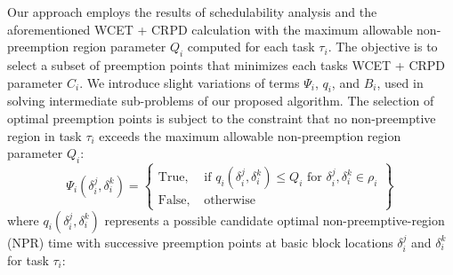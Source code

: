Our approach employs the results of schedulability analysis and the aforementioned WCET + CRPD calculation with the maximum allowable non-preemption region parameter \begin{math}Q_{i}\end{math} computed for each task \begin{math}\tau_{i}\end{math}.  The objective is to select a subset of preemption points that minimizes each tasks WCET + CRPD parameter \begin{math}C_{i}\end{math}. We introduce slight variations of terms \begin{math}\Psi_{i}\end{math}, \begin{math}q_{i}\end{math}, and \begin{math}B_{i}\end{math}, used in solving intermediate sub-problems of our proposed algorithm.  The selection of optimal preemption points is subject to the constraint that no non-preemptive region in task \begin{math}\tau_{i}\end{math} exceeds the maximum allowable non-preemption region parameter \begin{math}Q_{i}\end{math}:
\begin{equation}\label{eqn:pp-constraint}
   \Psi_{i}(\delta_{i}^{j},\delta_{i}^{k}) =
\left\{
\begin{array}{lr}
    \textrm{True, }&\textrm{if } q_{i}(\delta_{i}^{j},\delta_{i}^{k}) \leq Q_{i} \textrm{ for } \delta_{i}^{j},\delta_{i}^{k} \in \rho_{i} \\
    \textrm{False, }&\textrm{otherwise}
\end{array}
\right\}~
\end{equation}
\noindent
where \begin{math}q_{i}(\delta_{i}^{j},\delta_{i}^{k})\end{math} represents a possible candidate optimal non-preemptive-region (NPR) time with successive preemption points at basic block locations \begin{math}\delta_{i}^{j}\end{math} and \begin{math}\delta_{i}^{k}\end{math} for task \begin{math}\tau_{i}\end{math}:
